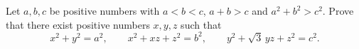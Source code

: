 Let \(a,b,c\) be positive numbers with \(a<b<c\), \(a+b>c\) and \(a^2+b^2>c^2\). Prove that there exist positive numbers \(x,y,z\) such that
\[
x^2+y^2=a^2,\qquad x^2+xz+z^2=b^2,\qquad y^2+\sqrt3\,yz+z^2=c^2 .
\]
